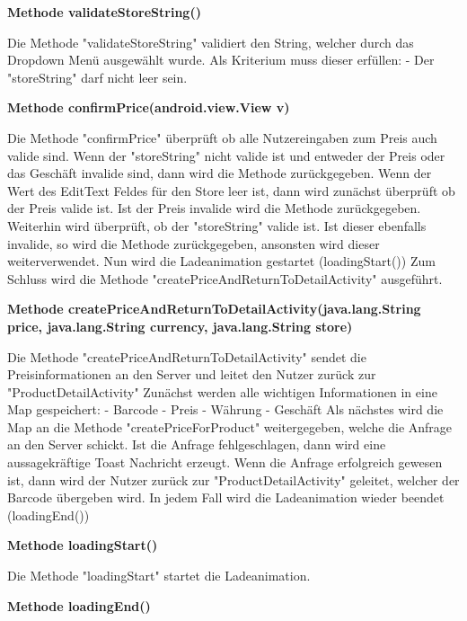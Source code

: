 \documentclass{scrartcl}
\begin{document}
\noindent\textbf{Methode validateStoreString()}

\noindent Die Methode "validateStoreString" validiert den String, welcher durch das Dropdown Menü ausgewählt wurde. Als Kriterium muss dieser erfüllen: - Der "storeString" darf nicht leer sein. \newline 

\noindent\textbf{Methode confirmPrice(android.view.View v)}

\noindent Die Methode "confirmPrice" überprüft ob alle Nutzereingaben zum Preis auch valide sind. Wenn der "storeString" nicht valide ist und entweder der Preis oder das Geschäft invalide sind, dann wird die Methode zurückgegeben. Wenn der Wert des EditText Feldes für den Store leer ist, dann wird zunächst überprüft ob der Preis valide ist. Ist der Preis invalide wird die Methode zurückgegeben. Weiterhin wird überprüft, ob der "storeString" valide ist. Ist dieser ebenfalls invalide, so wird die Methode zurückgegeben, ansonsten wird dieser weiterverwendet. Nun wird die Ladeanimation gestartet (loadingStart()) Zum Schluss wird die Methode "createPriceAndReturnToDetailActivity" ausgeführt. \newline 

\noindent\textbf{Methode createPriceAndReturnToDetailActivity(java.lang.String price, \newline java.lang.String currency,                                                java.lang.String store)}

\noindent Die Methode "createPriceAndReturnToDetailActivity" sendet die Preisinformationen an den Server und leitet den Nutzer zurück zur "ProductDetailActivity" Zunächst werden alle wichtigen Informationen in eine Map gespeichert: - Barcode - Preis - Währung - Geschäft Als nächstes wird die Map an die Methode "createPriceForProduct" weitergegeben, welche die Anfrage an den Server schickt. Ist die Anfrage fehlgeschlagen, dann wird eine aussagekräftige Toast Nachricht erzeugt. Wenn die Anfrage erfolgreich gewesen ist, dann wird der Nutzer zurück zur "ProductDetailActivity" geleitet, welcher der Barcode übergeben wird. In jedem Fall wird die Ladeanimation wieder beendet (loadingEnd()) \newline 

\noindent\textbf{Methode loadingStart()}

\noindent Die Methode "loadingStart" startet die Ladeanimation. \newline

\noindent\textbf{Methode loadingEnd()}
\end{document}

